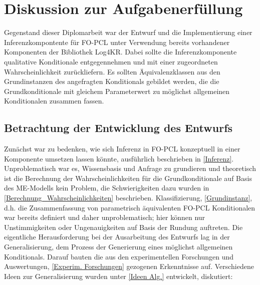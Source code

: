 \documentclass[a4paper, 11pt]{book}
\begin{document}
{\section{Diskussion zur Aufgabenerfüllung}
Gegenstand dieser Diplomarbeit war der Entwurf und die Implementierung einer Inferenzkompontente für FO-PCL unter Verwendung bereits vorhandener Komponenten der Bibliothek Log4KR. 
Dabei sollte die Inferenzkomponente qualitative Konditionale entgegennehmen und mit einer zugeordneten Wahrscheinlichkeit zurückliefern. Es sollten Äquivalenzklassen aus den Grundinstanzen des angefragten Konditionals gebildet werden, die die Grundkonditionale mit gleichem Parameterwert zu möglichst allgemeinen Konditionalen zusammen fassen.

\subsection{Betrachtung der Entwicklung des Entwurfs}
Zunächst war zu bedenken, wie sich Inferenz in FO-PCL konzeptuell in einer Komponente umsetzen lassen könnte, ausführlich beschrieben in \ref{Inferenz}. Unproblematisch war es, Wissensbasis und Anfrage zu grundieren und theoretisch ist die Berechnung der Wahrscheinlichkeiten für die Grundkonditionale auf Basis des ME-Modells kein Problem, die Schwierigkeiten dazu wurden in \ref{Berechnung_Wahrscheinlichkeiten} beschrieben. Klassifizierung, \ref{Grundinstanz}, d.h. die Zusammenfassung von parametrisch äquivalenten FO-PCL Konditionalen war bereits definiert und daher unproblematisch; hier können nur Unstimmigkeiten oder Ungenauigkeiten auf Basis der Rundung auftreten. Die eigentliche Herausforderung bei der Ausarbeitung des Entwurfs lag in der Generalisierung, dem Prozess der Generierung eines möglichst allgemeinen Konditionals. Darauf bauten die aus den experimentellen Forschungen und Auswertungen, \ref{Experim. Forschungen} gezogenen Erkenntnisse auf. Verschiedene Ideen zur Generalisierung wurden unter \ref{Ideen Alg.} entwickelt, diskutiert:

}
\end{document}
